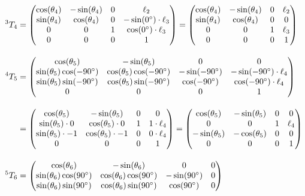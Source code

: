 \documentclass[12pt]{article}
\begin{document}
\begin{align*}
{}^{3}T_4 &= \begin{pmatrix}
\cos(\theta_4) & -\sin(\theta_4) & 0 & \ell_2 \\
\sin(\theta_4) & \cos(\theta_4) & 0 & -\sin(0\degree) \cdot \ell_3 \\
0 & 0 & 1 & \cos(0\degree) \cdot \ell_3 \\
0 & 0 & 0 & 1
\end{pmatrix}
= \begin{pmatrix}
\cos(\theta_4) & -\sin(\theta_4) & 0 & \ell_2 \\
\sin(\theta_4) & \cos(\theta_4) & 0 & 0 \\
0 & 0 & 1 & \ell_3 \\
0 & 0 & 0 & 1
\end{pmatrix} 
\\[1em]
{}^{4}T_5 &= \begin{pmatrix}
\cos(\theta_5) & -\sin(\theta_5) & 0 & 0 \\
\sin(\theta_5)\cos(-90\degree) & \cos(\theta_5)\cos(-90\degree) & -\sin(-90\degree) & -\sin(-90\degree) \cdot \ell_4 \\
\sin(\theta_5)\sin(-90\degree) & \cos(\theta_5)\sin(-90\degree) & \cos(-90\degree) & \cos(-90\degree) \cdot \ell_4 \\
0 & 0 & 0 & 1
\end{pmatrix} \\[1em]
&= \begin{pmatrix}
\cos(\theta_5) & -\sin(\theta_5) & 0 & 0 \\
\sin(\theta_5) \cdot 0 & \cos(\theta_5) \cdot 0 & 1 & 1 \cdot \ell_4 \\
\sin(\theta_5) \cdot -1 & \cos(\theta_5) \cdot -1 & 0 & 0 \cdot \ell_4 \\
0 & 0 & 0 & 1
\end{pmatrix}
= \begin{pmatrix}
\cos(\theta_5) & -\sin(\theta_5) & 0 & 0 \\
0 & 0 & 1 & \ell_4 \\
-\sin(\theta_5) & -\cos(\theta_5) & 0 & 0 \\
0 & 0 & 0 & 1
\end{pmatrix} 
\\[1em]
{}^{5}T_6 &= \begin{pmatrix}
\cos(\theta_6) & -\sin(\theta_6) & 0 & 0 \\
\sin(\theta_6)\cos(90\degree) & \cos(\theta_6)\cos(90\degree) & -\sin(90\degree) & 0 \\
\sin(\theta_6)\sin(90\degree) & \cos(\theta_6)\sin(90\degree) & \cos(90\degree) & 0 \\

\end{pmatrix}
\end{align*}
\end{document}
